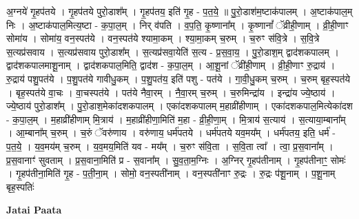 \documentclass[17pt]{extarticle}
\begin{document}
अ॒ग्नये॑ गृ॒हप॑तये । गृ॒हप॑तये पुरो॒डाश᳚म् । गृ॒हप॑तय॒ इति॑ गृ॒ह - प॒त॒ये॒ ॥ पु॒रो॒डाश॑म॒ष्टाक॑पालम् । अ॒ष्टाक॑पाल॒म् निः । अ॒ष्टाक॑पाल॒मित्य॒ष्टा - क॒पा॒ल॒म् । निर् व॑पति । व॒प॒ति॒ कृ॒ष्णाना᳚म् । कृ॒ष्णानां᳚ ॅव्रीही॒णाम् । व्री॒ही॒णाꣳ सोमा॑य । सोमा॑य॒ वन॒स्पत॑ये । वन॒स्पत॑ये श्यामा॒कम् । श्या॒मा॒कम् च॒रुम् । च॒रुꣳ स॑वि॒त्रे । स॒वि॒त्रे स॒त्यप्र॑सवाय । स॒त्यप्र॑सवाय पुरो॒डाश᳚म् । स॒त्यप्र॑सवा॒येति॑ स॒त्य - प्र॒स॒वा॒य॒ । पु॒रो॒डाश॒म् द्वाद॑शकपालम् । द्वाद॑शकपालमाशू॒नाम् । द्वाद॑शकपाल॒मिति॒ द्वाद॑श - क॒पा॒ल॒म् । आ॒शू॒नां ॅव्री॑ही॒णाम् । व्री॒ही॒णाꣳ रु॒द्राय॑ । रु॒द्राय॑ पशु॒पत॑ये । प॒शु॒पत॑ये गावीधु॒कम् । प॒शु॒पत॑य॒ इति॑ पशु - पत॑ये । गा॒वी॒धु॒कम् च॒रुम् । च॒रुम् बृह॒स्पत॑ये । बृह॒स्पत॑ये वा॒चः । वा॒चस्पत॑ये । पत॑ये नैवा॒रम् । नै॒वा॒रम् च॒रुम् । च॒रुमिन्द्रा॑य । इन्द्रा॑य ज्ये॒ष्ठाय॑ । ज्ये॒ष्ठाय॑ पुरो॒डाश᳚म् । पु॒रो॒डाश॒मेका॑दशकपालम् । एका॑दशकपालम् म॒हाव्री॑हीणाम् । एका॑दशकपाल॒मित्येका॑दश - क॒पा॒ल॒म् । म॒हाव्री॑हीणाम् मि॒त्राय॑ । म॒हाव्री॑हीणा॒मिति॑ म॒हा - व्री॒ही॒णा॒म् । मि॒त्राय॑ स॒त्याय॑ । स॒त्याया॒म्बाना᳚म् । आ॒म्बाना᳚म् च॒रुम् । च॒रुं ॅवरु॑णाय । वरु॑णाय॒ धर्म॑पतये । धर्म॑पतये यव॒मय᳚म् । धर्म॑पतय॒ इति॒ धर्म॑ - प॒त॒ये॒ । य॒व॒मय॑म् च॒रुम् । य॒व॒मय॒मिति॑ यव - मय᳚म् । च॒रुꣳ स॑वि॒ता । स॒वि॒ता त्वा᳚ । त्वा॒ प्र॒स॒वाना᳚म् । प्र॒स॒वानाꣳ॑ सुवताम् । प्र॒स॒वाना॒मिति॑ प्र - स॒वाना᳚म् । सु॒व॒ता॒म॒ग्निः । अ॒ग्निर् गृ॒हप॑तीनाम् । गृ॒हप॑तीनाꣳ॒॒ सोमः॑ । गृ॒हप॑तीना॒मिति॑ गृ॒ह - प॒ती॒ना॒म् । सोमो॒ वन॒स्पती॑नाम् । वन॒स्पती॑नाꣳ रु॒द्रः । रु॒द्रः प॑शू॒नाम् । प॒शू॒नाम् बृह॒स्पतिः॑ \newline

\textbf{Jatai Paata} \newline
\end{document}
